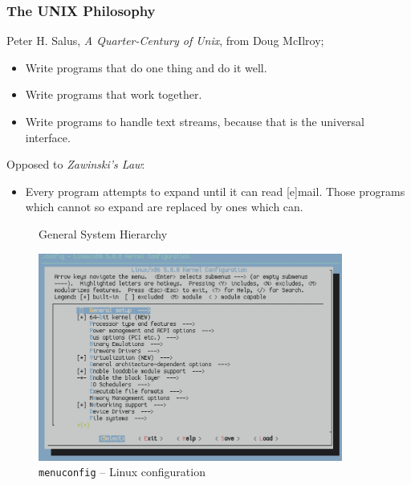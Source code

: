 \documentclass{beamer} \usetheme{Madrid}
\begin{document}
\begin{frame}
    \frametitle{The UNIX Philosophy}
    \vfill
    Peter H. Salus, \emph{A Quarter-Century of Unix}, from Doug McIlroy;
    \begin{itemize}
        \item Write programs that do one thing and do it well.
        \item Write programs that work together.
        \item Write programs to handle text streams, because that is the universal interface.
    \end{itemize}
    \vspace{1cm}
    Opposed to \emph{Zawinski's Law}:
    \begin{itemize}
        \item Every program attempts to expand until it can read [e]mail.
            Those programs which cannot so expand are replaced by ones which can.
    \end{itemize}
    \vfill
\end{frame}

\begin{frame}
    \vfill
    \begin{center}
    \begin{figure}
        \caption{General System Hierarchy}
    \end{figure}
    \end{center}
    \vfill
\end{frame}

\begin{frame}
    \begin{figure}
        \includegraphics[width=10cm]{menuconfig.png}
        \caption{\texttt{menuconfig} -- Linux configuration}
    \end{figure}
\end{frame}
\end{document}
